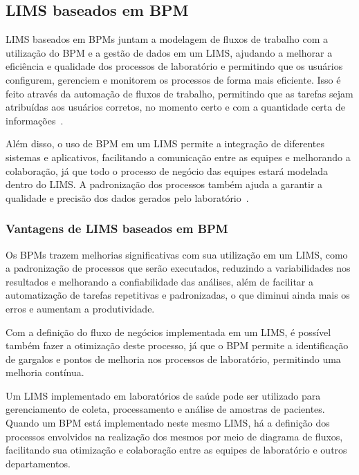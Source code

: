 \subsection{LIMS baseados em BPM}


LIMS baseados em BPMs juntam a modelagem de fluxos de trabalho com a utilização do BPM e a gestão de dados em um LIMS, ajudando a melhorar a eficiência e qualidade dos processos de laboratório e permitindo que os usuários configurem, gerenciem e monitorem os processos de forma mais eficiente. Isso é feito através da automação de fluxos de trabalho, permitindo que as tarefas sejam atribuídas aos usuários corretos, no momento certo e com a quantidade certa de informações~\cite{LIMS-BPMSLaboratory, LIMS-BPMSLaboratoryb}.

Além disso, o uso de BPM em um LIMS permite a integração de diferentes sistemas e aplicativos, facilitando a comunicação entre as equipes e melhorando a colaboração, já que todo o processo de negócio das equipes estará modelada dentro do LIMS. A padronização dos processos também ajuda a garantir a qualidade e precisão dos dados gerados pelo laboratório~\cite{LIMS-BPMSLaboratory, LIMS-BPMSLaboratoryb}.


\subsubsection{Vantagens de LIMS baseados em BPM}

Os BPMs trazem melhorias significativas com sua utilização em um LIMS, como a padronização de processos que serão executados, reduzindo a variabilidades nos resultados e melhorando a confiabilidade das análises, além de facilitar a automatização de tarefas repetitivas e padronizadas, o que diminui ainda mais os erros e aumentam a produtividade. \R

Com a definição do fluxo de negócios implementada em um LIMS, é possível também fazer a otimização deste processo, já que o BPM permite a identificação de gargalos e pontos de melhoria nos processos de laboratório, permitindo uma melhoria contínua. \R

Um LIMS implementado em laboratórios de saúde pode ser utilizado para gerenciamento de coleta, processamento e análise de amostras de pacientes. Quando um BPM está implementado neste mesmo LIMS, há a definição dos processos envolvidos na realização dos mesmos por meio de diagrama de fluxos, facilitando sua otimização e colaboração entre as equipes de laboratório e outros departamentos. \R

